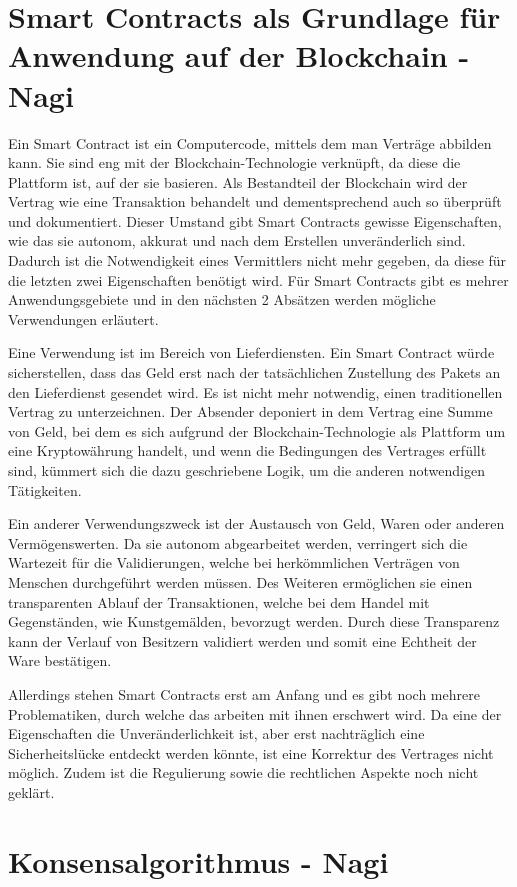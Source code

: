 \section{Smart Contracts als Grundlage für Anwendung auf der Blockchain - Nagi}
Ein Smart Contract \cite{CW18} ist ein Computercode, mittels dem man Verträge abbilden kann. Sie sind eng mit der Blockchain-Technologie verknüpft, da diese die Plattform ist, auf der sie basieren. Als Bestandteil der Blockchain wird der Vertrag wie eine Transaktion behandelt und dementsprechend auch so überprüft und dokumentiert. Dieser Umstand gibt Smart Contracts gewisse Eigenschaften, wie das sie autonom, akkurat und nach dem Erstellen unveränderlich sind. Dadurch ist die Notwendigkeit eines Vermittlers nicht mehr gegeben, da diese für die letzten zwei Eigenschaften benötigt wird. Für Smart Contracts gibt es mehrer Anwendungsgebiete und in den nächsten 2 Absätzen werden mögliche Verwendungen erläutert.

Eine Verwendung ist im Bereich von Lieferdiensten. Ein Smart Contract würde sicherstellen, dass das Geld erst nach der tatsächlichen Zustellung des Pakets an den Lieferdienst gesendet wird. Es ist nicht mehr notwendig, einen traditionellen Vertrag zu unterzeichnen. Der Absender deponiert in dem Vertrag eine Summe von Geld, bei dem es sich aufgrund der Blockchain-Technologie als Plattform um eine Kryptowährung handelt, und wenn die Bedingungen des Vertrages erfüllt sind, kümmert sich die dazu geschriebene Logik, um die anderen notwendigen Tätigkeiten.

Ein anderer Verwendungszweck ist der Austausch von Geld, Waren oder anderen Vermögenswerten. Da sie autonom abgearbeitet werden, verringert sich die Wartezeit für die Validierungen, welche bei herkömmlichen Verträgen von Menschen durchgeführt werden müssen. Des Weiteren ermöglichen sie einen transparenten Ablauf der Transaktionen, welche bei dem Handel mit Gegenständen, wie Kunstgemälden, bevorzugt werden. Durch diese Transparenz kann der Verlauf von Besitzern validiert werden und somit eine Echtheit der Ware bestätigen.

Allerdings stehen Smart Contracts erst am Anfang und es gibt noch mehrere Problematiken, durch welche das arbeiten mit ihnen erschwert wird. Da eine der Eigenschaften die Unveränderlichkeit ist, aber erst nachträglich eine Sicherheitslücke entdeckt werden könnte, ist eine Korrektur des Vertrages nicht möglich. Zudem ist die Regulierung sowie die rechtlichen Aspekte noch nicht geklärt.

\section{Konsensalgorithmus - Nagi}


